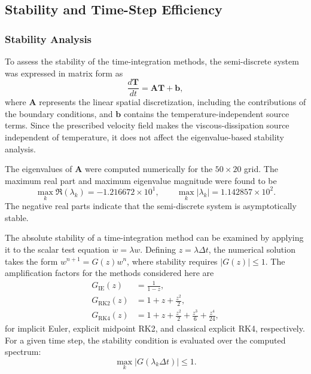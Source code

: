 \subsection{Stability and Time-Step Efficiency}
\label{subsec:stability_time_step}

\subsubsection{Stability Analysis}

To assess the stability of the time-integration methods, the
semi-discrete system was expressed in matrix form as
\begin{equation}
    \frac{d\mathbf{T}}{dt}
    =
    \mathbf{A}\mathbf{T}+\mathbf{b},
    \label{eq:semi_discrete_matrix}
\end{equation}
where $\mathbf{A}$ represents the linear spatial discretization,
including the contributions of the boundary conditions, and
$\mathbf{b}$ contains the temperature-independent source terms.
Since the prescribed velocity field makes the viscous-dissipation
source independent of temperature, it does not affect the
eigenvalue-based stability analysis.

The eigenvalues of $\mathbf{A}$ were computed numerically for
the $50\times20$ grid. The maximum real part and maximum
eigenvalue magnitude were found to be
\begin{equation}
    \max_k \Re(\lambda_k)
    =
    -1.216672\times10^{1},
    \qquad
    \max_k |\lambda_k|
    =
    1.142857\times10^{2}.
\end{equation}
The negative real parts indicate that the semi-discrete system
is asymptotically stable.

The absolute stability of a time-integration method can be
examined by applying it to the scalar test equation
$\dot{w}=\lambda w$. Defining $z=\lambda\Delta t$, the
numerical solution takes the form
$w^{n+1}=G(z)w^n$, where stability requires
$|G(z)|\leq1$. The amplification factors for the methods
considered here are
\begin{align}
    G_{\mathrm{IE}}(z)
    &=\frac{1}{1-z},
    \\
    G_{\mathrm{RK2}}(z)
    &=1+z+\frac{z^2}{2},
    \\
    G_{\mathrm{RK4}}(z)
    &=1+z+\frac{z^2}{2}
      +\frac{z^3}{6}+\frac{z^4}{24},
\end{align}
for implicit Euler, explicit midpoint RK2, and classical
explicit RK4, respectively. For a given time step, the
stability condition is evaluated over the computed spectrum:
\begin{equation}
    \max_k \left|G(\lambda_k\Delta t)\right|
    \leq 1.
    \label{eq:modal_stability_condition}
\end{equation}

